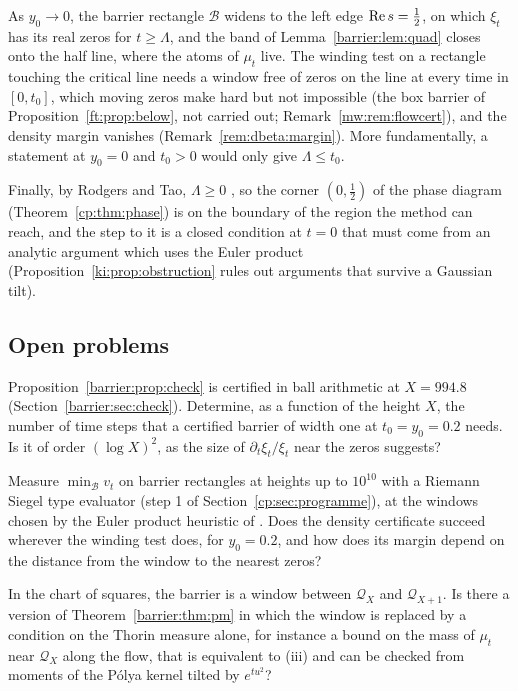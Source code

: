 As $y_0\to0$, the barrier rectangle $\mathcal B$ widens to the left edge $\operatorname{Re} s=\frac12$, on which $\xi_t$ has its real zeros for $t\ge\Lambda$, and the band of Lemma~\ref{barrier:lem:quad} closes onto the half line, where the atoms of $\mu_t$ live. The winding test on a rectangle touching the critical line needs a window free of zeros on the line at every time in $[0,t_0]$, which moving zeros make hard but not impossible (the box barrier of Proposition~\ref{ft:prop:below}, not carried out; Remark~\ref{mw:rem:flowcert}), and the density margin vanishes (Remark~\ref{rem:dbeta:margin}). More fundamentally, a statement at $y_0=0$ and $t_0>0$ would only give $\Lambda\le t_0$.

Finally, by Rodgers and Tao, $\Lambda\ge0$ \cite{RodgersTao}, so the corner $(0,\frac12)$ of the phase diagram (Theorem~\ref{cp:thm:phase}) is on the boundary of the region the method can reach, and the step to it is a closed condition at $t=0$ that must come from an analytic argument which uses the Euler product (Proposition~\ref{ki:prop:obstruction} rules out arguments that survive a Gaussian tilt).

\subsection{Open problems}\label{barrier:sec:open}

\begin{problem}\label{barrier:prob:certify}
Proposition~\ref{barrier:prop:check} is certified in ball arithmetic at $X=994.8$ (Section~\ref{barrier:sec:check}). Determine, as a function of the height $X$, the number of time steps that a certified barrier of width one at $t_0=y_0=0.2$ needs. Is it of order $(\log X)^2$, as the size of $\partial_t\xi_t/\xi_t$ near the zeros suggests?
\end{problem}

\begin{problem}\label{barrier:prob:margin}
Measure $\min_{\mathcal B}v_t$ on barrier rectangles at heights up to $10^{10}$ with a Riemann Siegel type evaluator (step 1 of Section~\ref{cp:sec:programme}), at the windows chosen by the Euler product heuristic of \cite{Polymath}. Does the density certificate succeed wherever the winding test does, for $y_0=0.2$, and how does its margin depend on the distance from the window to the nearest zeros?
\end{problem}

\begin{problem}\label{barrier:prob:window}
In the chart of squares, the barrier is a window between $\mathcal Q_X$ and $\mathcal Q_{X+1}$. Is there a version of Theorem~\ref{barrier:thm:pm} in which the window is replaced by a condition on the Thorin measure alone, for instance a bound on the mass of $\mu_t$ near $\mathcal Q_X$ along the flow, that is equivalent to (iii) and can be checked from moments of the P\'olya kernel tilted by $e^{tu^2}$?
\end{problem}

